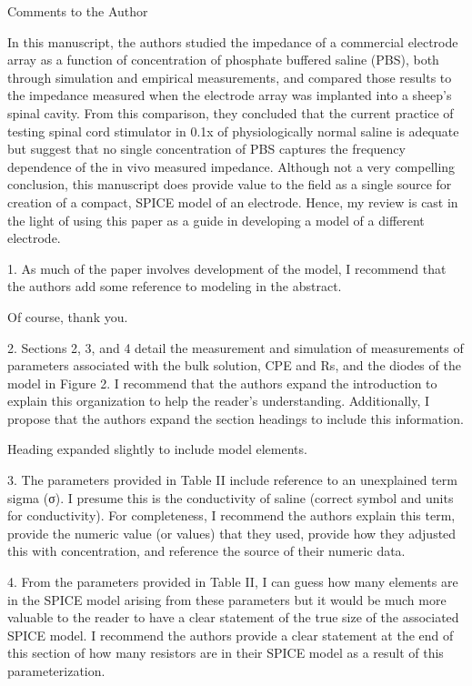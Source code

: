 \documentclass[journal, a4paper]{IEEEtran}
\begin{document}
Comments to the Author

{
    \color{OliveGreen}
    In this manuscript, the authors studied the impedance of a commercial electrode array as a function of concentration of phosphate buffered saline (PBS), both through simulation and empirical measurements, and compared those results to the impedance measured when the electrode array was implanted into a sheep's spinal cavity. From this comparison, they concluded that the current practice of testing spinal cord stimulator in 0.1x of physiologically normal saline is adequate but suggest that no single concentration of PBS captures the frequency dependence of the in vivo measured impedance. Although not a very compelling conclusion, this manuscript does provide value to the field as a single source for creation of a compact, SPICE model of an electrode. Hence, my review is cast in the light of using this paper as a guide in developing a model of a different electrode.

    1. As much of the paper involves development of the model, I recommend that the authors add some reference to modeling in the abstract.

    {
        \color{blue}
        Of course, thank you.
    }

    2. Sections 2, 3, and 4 detail the measurement and simulation of measurements of parameters associated with the bulk solution, CPE and Rs, and the diodes of the model in Figure 2. I recommend that the authors expand the introduction to explain this organization to help the reader's understanding. Additionally, I propose that the authors expand the section headings to include this information.

    {
        \color{blue}
        Heading expanded slightly to include model elements.
    }

    3. The parameters provided in Table II include reference to an unexplained term sigma (σ). I presume this is the conductivity of saline (correct symbol and units for conductivity). For completeness, I recommend the authors explain this term, provide the numeric value (or values) that they used, provide how they adjusted this with concentration, and reference the source of their numeric data.

    4. From the parameters provided in Table II, I can guess how many elements are in the SPICE model arising from these parameters but it would be much more valuable to the reader to have a clear statement of the true size of the associated SPICE model. I recommend the authors provide a clear statement at the end of this section of how many resistors are in their SPICE model as a result of this parameterization.

}
\end{document}
